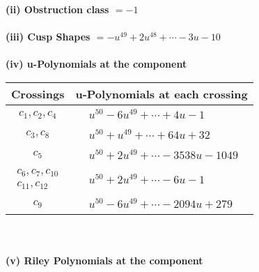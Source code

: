 \documentclass[1p]{elsarticle_modified}
\theoremstyle{definition}
\begin{document}
\flushleft \textbf{(ii) Obstruction class $= -1$}\\~\\
\flushleft \textbf{(iii) Cusp Shapes $= - u^{49}+2 u^{48}+\cdots-3 u-10$}\\~\\
\newpage\renewcommand{\arraystretch}{1}
\flushleft \textbf{(iv) u-Polynomials at the component}\newline \\
\begin{tabular}{m{50pt}|m{274pt}}
Crossings & \hspace{64pt}u-Polynomials at each crossing \\
\hline $$\begin{aligned}c_{1},c_{2},c_{4}\end{aligned}$$&$\begin{aligned}
&u^{50}-6 u^{49}+\cdots+4 u-1
\end{aligned}$\\
\hline $$\begin{aligned}c_{3},c_{8}\end{aligned}$$&$\begin{aligned}
&u^{50}+u^{49}+\cdots+64 u+32
\end{aligned}$\\
\hline $$\begin{aligned}c_{5}\end{aligned}$$&$\begin{aligned}
&u^{50}+2 u^{49}+\cdots-3538 u-1049
\end{aligned}$\\
\hline $$\begin{aligned}c_{6},c_{7},c_{10}\\c_{11},c_{12}\end{aligned}$$&$\begin{aligned}
&u^{50}+2 u^{49}+\cdots-6 u-1
\end{aligned}$\\
\hline $$\begin{aligned}c_{9}\end{aligned}$$&$\begin{aligned}
&u^{50}-6 u^{49}+\cdots-2094 u+279
\end{aligned}$\\
\hline
\end{tabular}\\~\\
\newpage\renewcommand{\arraystretch}{1}
\flushleft \textbf{(v) Riley Polynomials at the component}\newline \\
\end{document}
